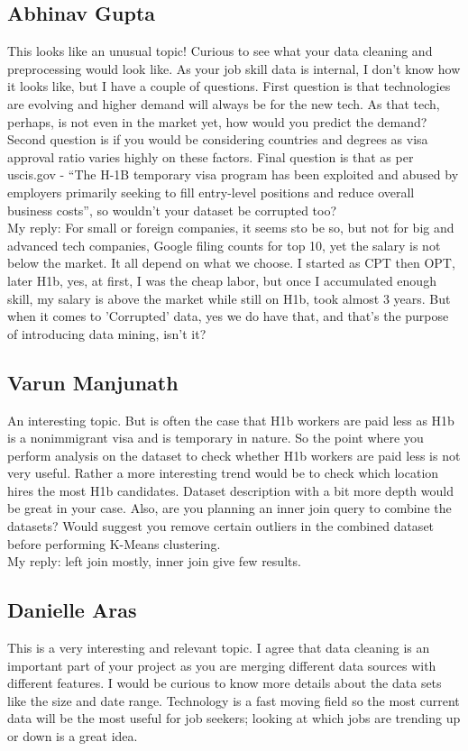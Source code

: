 \subsection*{Abhinav Gupta}
This looks like an unusual topic! Curious to see what your data cleaning and preprocessing would look like.
As your job skill data is internal, I don't know how it looks like, but I have a couple of questions. First question is that technologies are evolving and higher demand will always be for the new tech. As that tech, perhaps, is not even in the market yet, how would you predict the demand? Second question is if you would be considering countries and degrees as visa approval ratio varies highly on these factors. Final question is that as per uscis.gov - “The H-1B temporary visa program has been exploited and abused by employers primarily seeking to fill entry-level positions and reduce overall business costs”, so wouldn't your dataset be corrupted too?\\
My reply: For small or foreign companies, it seems sto be so, but not for big and advanced tech companies, Google filing counts for top 10, yet the salary is not below the market. It all depend on what we choose. I started as CPT then OPT, later H1b, yes, at first, I was the cheap labor, but once I accumulated enough skill, my salary is above the market while still on H1b, took almost 3 years. But when it comes to 'Corrupted' data, yes we do have that, and that's the purpose of introducing data mining, isn't it? 
\subsection*{Varun Manjunath}
An interesting topic. But is often the case that H1b workers are paid less as H1b is a nonimmigrant visa and is temporary in nature. So the point where you perform analysis on the dataset to check whether H1b workers are paid less is not very useful. Rather a more interesting trend would be to check which location hires the most H1b candidates. Dataset description with a bit more depth would be great in your case. Also, are you planning an inner join query to combine the datasets? Would suggest you remove certain outliers in the combined dataset before performing K-Means clustering.\\
My reply: left join mostly, inner join give few results.
\subsection*{Danielle Aras}
This is a very interesting and relevant topic. I agree that data cleaning is an important part of your project as you are merging different data sources with different features. I would be curious to know more details about the data sets like the size and date range. Technology is a fast moving field so the most current data will be the most useful for job seekers; looking at which jobs are trending up or down is a great idea.


